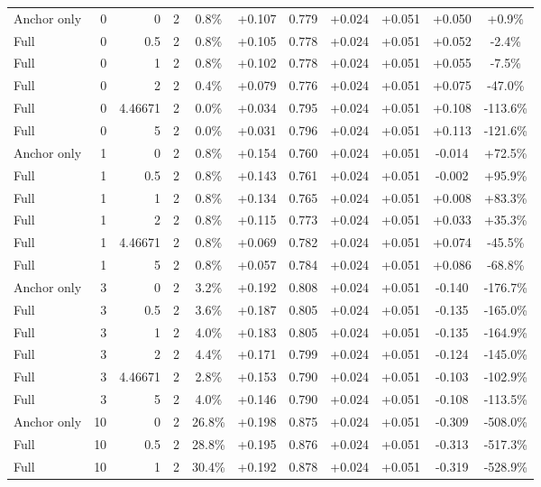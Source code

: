 \begin{table}[htbp]
\begin{tabular}{lrrrccccccc}
Anchor only & 0 & 0 & 2 & 0.8\% & +0.107 & 0.779 & +0.024 & +0.051 & +0.050 & +0.9\% \\
Full & 0 & 0.5 & 2 & 0.8\% & +0.105 & 0.778 & +0.024 & +0.051 & +0.052 & -2.4\% \\
Full & 0 & 1 & 2 & 0.8\% & +0.102 & 0.778 & +0.024 & +0.051 & +0.055 & -7.5\% \\
Full & 0 & 2 & 2 & 0.4\% & +0.079 & 0.776 & +0.024 & +0.051 & +0.075 & -47.0\% \\
Full & 0 & 4.46671 & 2 & 0.0\% & +0.034 & 0.795 & +0.024 & +0.051 & +0.108 & -113.6\% \\
Full & 0 & 5 & 2 & 0.0\% & +0.031 & 0.796 & +0.024 & +0.051 & +0.113 & -121.6\% \\
Anchor only & 1 & 0 & 2 & 0.8\% & +0.154 & 0.760 & +0.024 & +0.051 & -0.014 & +72.5\% \\
Full & 1 & 0.5 & 2 & 0.8\% & +0.143 & 0.761 & +0.024 & +0.051 & -0.002 & +95.9\% \\
Full & 1 & 1 & 2 & 0.8\% & +0.134 & 0.765 & +0.024 & +0.051 & +0.008 & +83.3\% \\
Full & 1 & 2 & 2 & 0.8\% & +0.115 & 0.773 & +0.024 & +0.051 & +0.033 & +35.3\% \\
Full & 1 & 4.46671 & 2 & 0.8\% & +0.069 & 0.782 & +0.024 & +0.051 & +0.074 & -45.5\% \\
Full & 1 & 5 & 2 & 0.8\% & +0.057 & 0.784 & +0.024 & +0.051 & +0.086 & -68.8\% \\
Anchor only & 3 & 0 & 2 & 3.2\% & +0.192 & 0.808 & +0.024 & +0.051 & -0.140 & -176.7\% \\
Full & 3 & 0.5 & 2 & 3.6\% & +0.187 & 0.805 & +0.024 & +0.051 & -0.135 & -165.0\% \\
Full & 3 & 1 & 2 & 4.0\% & +0.183 & 0.805 & +0.024 & +0.051 & -0.135 & -164.9\% \\
Full & 3 & 2 & 2 & 4.4\% & +0.171 & 0.799 & +0.024 & +0.051 & -0.124 & -145.0\% \\
Full & 3 & 4.46671 & 2 & 2.8\% & +0.153 & 0.790 & +0.024 & +0.051 & -0.103 & -102.9\% \\
Full & 3 & 5 & 2 & 4.0\% & +0.146 & 0.790 & +0.024 & +0.051 & -0.108 & -113.5\% \\
Anchor only & 10 & 0 & 2 & 26.8\% & +0.198 & 0.875 & +0.024 & +0.051 & -0.309 & -508.0\% \\
Full & 10 & 0.5 & 2 & 28.8\% & +0.195 & 0.876 & +0.024 & +0.051 & -0.313 & -517.3\% \\
Full & 10 & 1 & 2 & 30.4\% & +0.192 & 0.878 & +0.024 & +0.051 & -0.319 & -528.9\% \\

\end{tabular}
\end{table}
